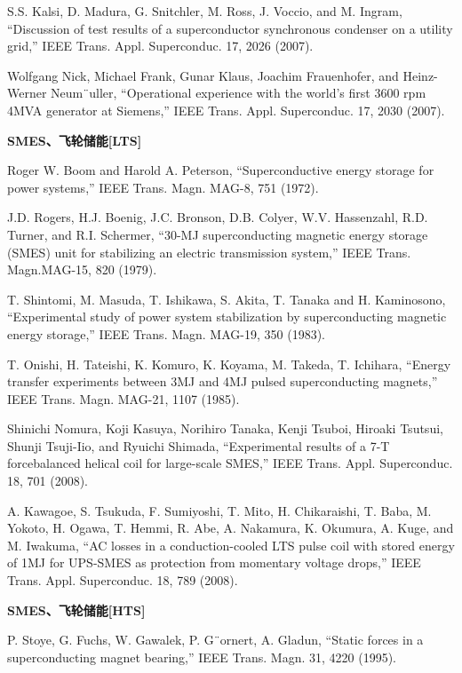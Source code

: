 \noindent [9.73] S.S. Kalsi, D. Madura, G. Snitchler, M. Ross, J. Voccio, and M. Ingram, ``Discussion
of test results of a superconductor synchronous condenser on a utility grid,”
IEEE Trans. Appl. Superconduc. 17, 2026 (2007).

\noindent [9.74] Wolfgang Nick, Michael Frank, Gunar Klaus, Joachim Frauenhofer, and Heinz-
Werner Neum¨uller, ``Operational experience with the world’s first 3600 rpm 4MVA
generator at Siemens,” IEEE Trans. Appl. Superconduc. 17, 2030 (2007).

\noindent \textbf{SMES、飞轮储能[LTS] }

\noindent [9.75] Roger W. Boom and Harold A. Peterson, ``Superconductive energy storage for
power systems,” IEEE Trans. Magn. MAG-8, 751 (1972).

\noindent [9.76] J.D. Rogers, H.J. Boenig, J.C. Bronson, D.B. Colyer, W.V. Hassenzahl, R.D. Turner, and R.I. Schermer, ``30-MJ superconducting magnetic energy storage (SMES)
unit for stabilizing an electric transmission system,” IEEE Trans. Magn.MAG-15,
820 (1979).

\noindent [9.77] T. Shintomi, M. Masuda, T. Ishikawa, S. Akita, T. Tanaka and H. Kaminosono,
``Experimental study of power system stabilization by superconducting magnetic
energy storage,” IEEE Trans. Magn. MAG-19, 350 (1983).

\noindent [9.78] T. Onishi, H. Tateishi, K. Komuro, K. Koyama, M. Takeda, T. Ichihara, ``Energy
transfer experiments between 3MJ and 4MJ pulsed superconducting magnets,”
IEEE Trans. Magn. MAG-21, 1107 (1985).

\noindent [9.79] Shinichi Nomura, Koji Kasuya, Norihiro Tanaka, Kenji Tsuboi, Hiroaki Tsutsui,
Shunji Tsuji-Iio, and Ryuichi Shimada, ``Experimental results of a 7-T forcebalanced
helical coil for large-scale SMES,” IEEE Trans. Appl. Superconduc. 18,
701 (2008).

\noindent [9.80] A. Kawagoe, S. Tsukuda, F. Sumiyoshi, T. Mito, H. Chikaraishi, T. Baba, M. Yokoto,
H. Ogawa, T. Hemmi, R. Abe, A. Nakamura, K. Okumura, A. Kuge, and M.
Iwakuma, ``AC losses in a conduction-cooled LTS pulse coil with stored energy of
1MJ for UPS-SMES as protection from momentary voltage drops,” IEEE Trans.
Appl. Superconduc. 18, 789 (2008).

\noindent \textbf{SMES、飞轮储能[HTS] }

\noindent [9.81] P. Stoye, G. Fuchs, W. Gawalek, P. G¨ornert, A. Gladun, ``Static forces in a superconducting
magnet bearing,” IEEE Trans. Magn. 31, 4220 (1995).

